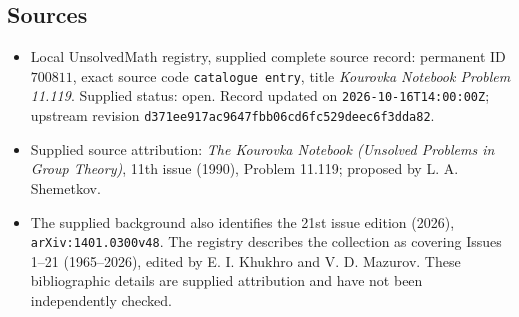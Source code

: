 \documentclass[11pt]{article}
\begin{document}
\subsection{Sources}
\begin{itemize}
\item Local UnsolvedMath registry, supplied complete source record: permanent ID \(700811\), exact source code \texttt{catalogue entry}, title \emph{Kourovka Notebook Problem 11.119}. Supplied status: open. Record updated on \texttt{2026-10-16T14:00:00Z}; upstream revision \texttt{d371ee917ac9647fbb06cd6fc529deec6f3dda82}.
\item Supplied source attribution: \emph{The Kourovka Notebook (Unsolved Problems in Group Theory)}, 11th issue (1990), Problem 11.119; proposed by L. A. Shemetkov.
\item The supplied background also identifies the 21st issue edition (2026), \texttt{arXiv:1401.0300v48}. The registry describes the collection as covering Issues 1--21 (1965--2026), edited by E. I. Khukhro and V. D. Mazurov. These bibliographic details are supplied attribution and have not been independently checked.
\end{itemize}
\end{document}
